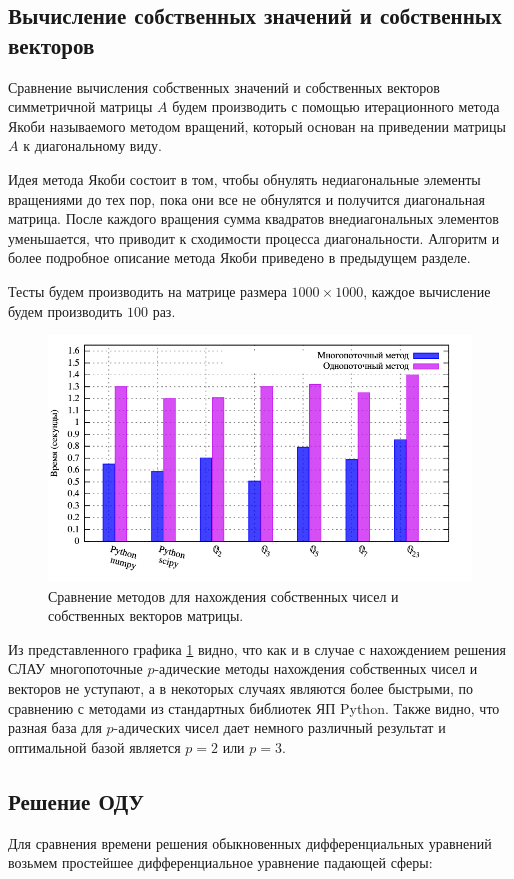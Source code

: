 \documentclass[master, och, diploma, times]{sty/SCWorks}
\theoremstyle{plain}
\theoremstyle{definition}
\numberwithin{equation}{section}
\begin{document}
\subsection{Вычисление собственных значений и собственных векторов}
Сравнение вычисления собственных значений и собственных векторов симметричной матрицы $A$ будем производить с помощью итерационного метода Якоби называемого методом вращений, который основан на приведении матрицы $A$ к диагональному виду.

Идея метода Якоби состоит в том, чтобы обнулять недиагональные элементы вращениями до тех пор, пока они все не обнулятся и получится диагональная матрица. После каждого вращения сумма квадратов внедиагональных элементов уменьшается, что приводит к сходимости процесса диагональности. Алгоритм и более подробное описание метода Якоби приведено в предыдущем разделе.

Тесты будем производить на матрице размера $1000 \times 1000$, каждое вычисление будем производить $100$ раз. 

\begin{figure}[H]
\centerline{\includegraphics[width=0.85\linewidth]{../gnuplot/multi/jacoby/plot.png}}
\caption{Сравнение методов для нахождения собственных чисел и собственных векторов матрицы.}
\label{img:multi:jacoby}
\end{figure}

Из представленного графика \ref{img:multi:jacoby} видно, что как и в случае с нахождением решения СЛАУ многопоточные $p$-адические методы нахождения собственных чисел и векторов не уступают, а в некоторых случаях являются более быстрыми, по сравнению с методами из стандартных библиотек ЯП Python. Также видно, что разная база для $p$-адических чисел дает немного различный результат и оптимальной базой является $p=2$ или $p=3$.

\subsection{Решение ОДУ}
Для сравнения времени решения обыкновенных дифференциальных уравнений возьмем простейшее дифференциальное уравнение падающей \mbox{сферы:}
\end{document}
